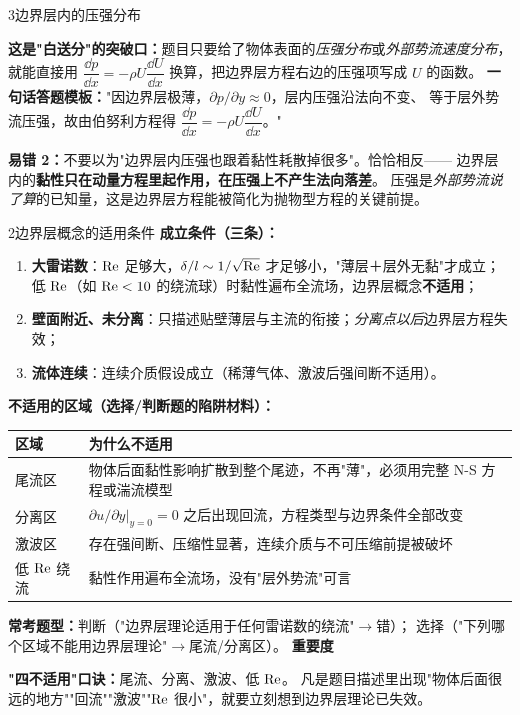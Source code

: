 \begin{kaodian}{3}{边界层内的压强分布}
\begin{banfa}
\textbf{这是"白送分"的突破口：}题目只要给了物体表面的\emph{压强分布}或\emph{外部势流速度分布}，
就能直接用 $\dfrac{\dd p}{\dd x}=-\rho U\dfrac{\dd U}{\dd x}$ 换算，把边界层方程右边的压强项写成 $U$ 的函数。
\textbf{一句话答题模板：}"因边界层极薄，$\partial p/\partial y\approx0$，层内压强沿法向不变、
等于层外势流压强，故由伯努利方程得 $\dfrac{\dd p}{\dd x}=-\rho U\dfrac{\dd U}{\dd x}$。"
\end{banfa}

\begin{yicuo}
\textbf{易错 2：}不要以为"边界层内压强也跟着黏性耗散掉很多"。恰恰相反——
边界层内的\textbf{黏性只在动量方程里起作用，在压强上不产生法向落差}。
压强是\emph{外部势流说了算}的已知量，这是边界层方程能被简化为抛物型方程的关键前提。
\end{yicuo}
\end{kaodian}

\begin{kaodian}{2}{边界层概念的适用条件}
\textbf{成立条件（三条）：}
\begin{enumerate}
  \item \textbf{大雷诺数}：$\mathrm{Re}$ 足够大，$\delta/l\sim1/\sqrt{\mathrm{Re}}$ 才足够小，"薄层＋层外无黏"才成立；
  低 $\mathrm{Re}$（如 $\mathrm{Re}<10$ 的绕流球）时黏性遍布全流场，边界层概念\textbf{不适用}；
  \item \textbf{壁面附近、未分离}：只描述贴壁薄层与主流的衔接；\emph{分离点以后}边界层方程失效；
  \item \textbf{流体连续}：连续介质假设成立（稀薄气体、激波后强间断不适用）。
\end{enumerate}

\textbf{不适用的区域（选择/判断题的陷阱材料）：}
\begin{center}
\begin{tabularx}{\textwidth}{@{}lX@{}}
\toprule
区域 & 为什么不适用 \\
\midrule
尾流区 & 物体后面黏性影响扩散到整个尾迹，不再"薄"，必须用完整 N-S 方程或湍流模型 \\
分离区 & $\partial u/\partial y|_{y=0}=0$ 之后出现回流，方程类型与边界条件全部改变 \\
激波区 & 存在强间断、压缩性显著，连续介质与不可压缩前提被破坏 \\
低 $\mathrm{Re}$ 绕流 & 黏性作用遍布全流场，没有"层外势流"可言 \\
\bottomrule
\end{tabularx}
\end{center}

\textbf{常考题型：}判断（"边界层理论适用于任何雷诺数的绕流"$\to$错）；
选择（"下列哪个区域不能用边界层理论"$\to$尾流/分离区）。
\textbf{重要度 }\quad{}\quad{}

\begin{banfa}
\textbf{"四不适用"口诀：}尾流、分离、激波、低 $\mathrm{Re}$。
凡是题目描述里出现"物体后面很远的地方""回流""激波""$\mathrm{Re}$ 很小"，就要立刻想到边界层理论已失效。
\end{banfa}
\end{kaodian}

